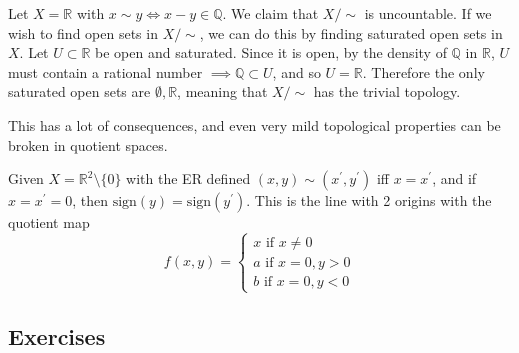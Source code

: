     \begin{example}
      Let $X = \mathbb{R}$ with $x \sim y \iff x - y \in \mathbb{Q}$. We claim that $X/\sim$ is uncountable. If we wish to find open sets in $X/\sim$, we can do this by finding saturated open sets in $X$. Let $U \subset \mathbb{R}$ be open and saturated. Since it is open, by the density of $\mathbb{Q}$ in $\mathbb{R}$, $U$ must contain a rational number $\implies \mathbb{Q} \subset U$, and so $U = \mathbb{R}$. Therefore the only saturated open sets are $\emptyset, \mathbb{R}$, meaning that $X/\sim$ has the trivial topology. 
    \end{example}

    This has a lot of consequences, and even very mild topological properties can be broken in quotient spaces.  

    \begin{example}
      Given $X = \mathbb{R}^2 \setminus \{0\}$ with the ER defined $(x, y) \sim (x^\prime, y^\prime)$ iff $x = x^\prime$, and if $x = x^\prime = 0$, then $\mathrm{sign}(y) = \mathrm{sign}(y^\prime)$. This is the line with 2 origins with the quotient map 
      \begin{equation}
        f(x, y) = \begin{cases} 
          x \text{ if } x \neq 0 \\
          a \text{ if } x = 0, y > 0 \\ 
          b \text{ if } x = 0, y < 0
        \end{cases}
      \end{equation}
    \end{example}

\subsection{Exercises}

